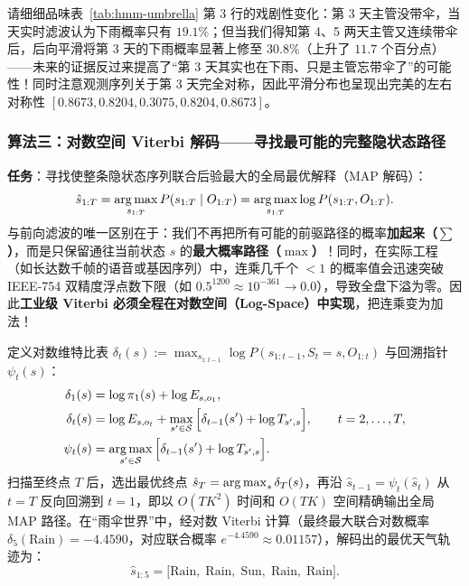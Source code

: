 请细细品味表~\ref{tab:hmm-umbrella} 第 3 行的戏剧性变化：第 3 天主管没带伞，当天实时滤波认为下雨概率只有 \textbf{$19.1\%$}；但当我们得知第 4、5 两天主管又连续带伞后，后向平滑将第 3 天的下雨概率显著上修至 \textbf{$30.8\%$}（上升了 $11.7$ 个百分点）——未来的证据反过来提高了“第 3 天其实也在下雨、只是主管忘带伞了”的可能性！同时注意观测序列关于第 3 天完全对称，因此平滑分布也呈现出完美的左右对称性 $[0.8673, 0.8204, 0.3075, 0.8204, 0.8673]$。

\subsubsection{算法三：对数空间 Viterbi 解码——寻找最可能的完整隐状态路径}

\textbf{任务}：寻找使整条隐状态序列联合后验最大的全局最优解释（MAP 解码）：
\[
  \hat{s}_{1:T} = \operatorname*{arg\,max}_{s_{1:T}} P(s_{1:T} \mid O_{1:T}) = \operatorname*{arg\,max}_{s_{1:T}} \log P(s_{1:T}, O_{1:T}).
\]
与前向滤波的唯一区别在于：我们不再把所有可能的前驱路径的概率\textbf{加起来（$\sum$）}，而是只保留通往当前状态 $s$ 的\textbf{最大概率路径（$\max$）}！同时，在实际工程（如长达数千帧的语音或基因序列）中，连乘几千个 $<1$ 的概率值会迅速突破 IEEE-754 双精度浮点数下限（如 $0.5^{1200} \approx 10^{-361} \to 0.0$），导致全盘下溢为零。因此\textbf{工业级 Viterbi 必须全程在对数空间（Log-Space）中实现}，把连乘变为加法！

定义对数维特比表 $\delta_t(s) := \max_{s_{1:t-1}} \log P(s_{1:t-1}, S_t = s, O_{1:t})$ 与回溯指针 $\psi_t(s)$：
\begin{align}
  \delta_1(s) &= \log \pi_1(s) + \log E_{s, o_1}, \label{eq:viterbi-init}\\
  \delta_t(s) &= \log E_{s, o_t} + \max_{s' \in \mathcal{S}} \Big[\delta_{t-1}(s') + \log T_{s', s}\Big], \qquad t = 2, \dots, T, \label{eq:viterbi-dp}\\
  \psi_t(s) &= \operatorname*{arg\,max}_{s' \in \mathcal{S}} \Big[\delta_{t-1}(s') + \log T_{s', s}\Big]. \label{eq:viterbi-ptr}
\end{align}
扫描至终点 $T$ 后，选出最优终点 $\hat{s}_T = \operatorname*{arg\,max}_s \delta_T(s)$，再沿 $\hat{s}_{t-1} = \psi_t(\hat{s}_t)$ 从 $t=T$ 反向回溯到 $t=1$，即以 $O(T K^2)$ 时间和 $O(T K)$ 空间精确输出全局 MAP 路径。在“雨伞世界”中，经对数 Viterbi 计算（最终最大联合对数概率 $\delta_5(\text{Rain}) = -4.4590$，对应联合概率 $e^{-4.4590} \approx 0.01157$），解码出的最优天气轨迹为：
\[
  \hat{s}_{1:5} = \big[\text{Rain},\; \text{Rain},\; \text{Sun},\; \text{Rain},\; \text{Rain}\big].
\]

